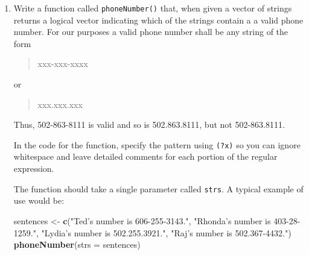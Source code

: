 \documentclass[]{book}
\makeatletter
\newenvironment{Shaded}{\begin{snugshade}}{\end{snugshade}}
\newcommand{\KeywordTok}[1]{\textcolor[rgb]{0.13,0.29,0.53}{\textbf{{#1}}}}
\newcommand{\DataTypeTok}[1]{\textcolor[rgb]{0.13,0.29,0.53}{{#1}}}
\newcommand{\StringTok}[1]{\textcolor[rgb]{0.31,0.60,0.02}{{#1}}}
\newcommand{\NormalTok}[1]{{#1}}
\newenvironment{kframe}{%
\medskip{}
\setlength{\fboxsep}{.8em}
 \def\at@end@of@kframe{}%
 \ifinner\ifhmode%
  \def\at@end@of@kframe{\end{minipage}}%
  \begin{minipage}{\columnwidth}%
 \fi\fi%
 \def\FrameCommand##1{\hskip\@totalleftmargin \hskip-\fboxsep
 \colorbox{shadecolor}{##1}\hskip-\fboxsep
     \hskip-\linewidth \hskip-\@totalleftmargin \hskip\columnwidth}%
 \MakeFramed {\advance\hsize-\width
   \@totalleftmargin\z@ \linewidth\hsize
   \@setminipage}}%
 {\par\unskip\endMakeFramed%
 \at@end@of@kframe}
\renewenvironment{Shaded}{\begin{kframe}}{\end{kframe}}
\theoremstyle{definition}
\theoremstyle{definition}
\theoremstyle{remark}
\makeatother
\begin{document}
{\begin{enumerate}
\begin{Shaded}
\begin{Highlighting}[]
\NormalTok{myText <-}\StringTok{ }\KeywordTok{c}\NormalTok{(}\StringTok{"Very short words."}\NormalTok{, }\StringTok{"Got a gargantuan word."}\NormalTok{, }\StringTok{"More short words!"}\NormalTok{)}
\KeywordTok{longWord2}\NormalTok{(}\DataTypeTok{strs =} \NormalTok{myText)}
\end{Highlighting}
\end{Shaded}

\begin{verbatim}
## [[1]]
## character(0)
## 
## [[2]]
## [1] "gargantuan"
## 
## [[3]]
## character(0)
\end{verbatim}
\item
  Write a function called \texttt{phoneNumber()} that, when given a
  vector of strings returns a logical vector indicating which of the
  strings contain a a valid phone number. For our purposes a valid phone
  number shall be any string of the form

  \begin{quote}
  xxx-xxx-xxxx
  \end{quote}

  or

  \begin{quote}
  xxx.xxx.xxx
  \end{quote}

  Thus, 502-863-8111 is valid and so is 502.863.8111, but not
  502-863.8111.

  In the code for the function, specify the pattern using \texttt{(?x)}
  so you can ignore whitespace and leave detailed comments for each
  portion of the regular expression.

  The function should take a single parameter called \texttt{strs}. A
  typical example of use would be:

\begin{Shaded}
\begin{Highlighting}[]
\NormalTok{sentences <-}\StringTok{ }\KeywordTok{c}\NormalTok{(}\StringTok{"Ted's number is 606-255-3143."}\NormalTok{,}
               \StringTok{"Rhonda's number is 403-28-1259."}\NormalTok{,}
               \StringTok{"Lydia's number is 502.255.3921."}\NormalTok{,}
               \StringTok{"Raj's number is 502.367-4432."}\NormalTok{)}
\KeywordTok{phoneNumber}\NormalTok{(}\DataTypeTok{strs =} \NormalTok{sentences)}
\end{Highlighting}
\end{Shaded}


\end{enumerate}}
\end{document}
